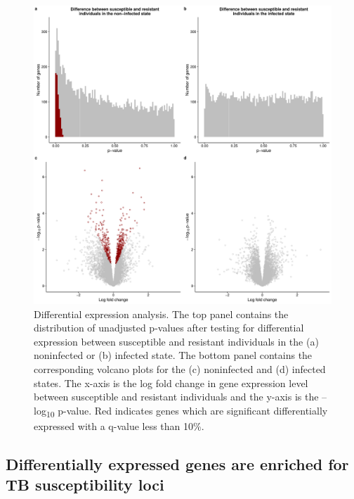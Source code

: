 \documentclass[fleqn,10pt]{wlscirep}
\begin{document}
\begin{figure}[p]
\centering
\includegraphics[width=\linewidth]{../figure/limma.pdf}
\caption{
Differential expression analysis. The top panel contains the distribution of unadjusted p-values after testing for differential expression between susceptible and resistant individuals in the (a) noninfected or (b) infected state. The bottom panel contains the corresponding volcano plots for the (c) noninfected and (d) infected states. The x-axis is the log fold change in gene expression level between susceptible and resistant individuals and the y-axis is the –log\textsubscript{10} p-value. Red indicates genes which are significant differentially expressed with a q-value less than 10\%.
}
\label{fig:limma}
\end{figure}
\subsection*{Differentially expressed genes are enriched for TB susceptibility loci}
\end{document}
